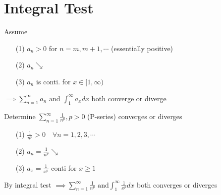 \section{Integral Test}
\begin{defn}
Assume
\begin{itemize}
\item[(1)] \(a_n > 0\) \quad for \(n = m, m + 1, \cdots\) (essentially positive)
\item[(2)] \(a_n \searrow\)
\item[(3)] \(a_n\) is conti. for \(x \in [1, \infty)\)
\end{itemize}
\(\implies \displaystyle \sum^{\infty}_{n = 1} a_n \text{ and } \int^{\infty}_1 a_x dx\) both converge or diverge
\end{defn}
\begin{eg}
Determine \(\displaystyle \sum^{\infty}_{n = 1} \frac{1}{n^p}, p > 0\) (P-series) converges or diverges\\

\soln
\begin{itemize}
\item[(1)] \(\displaystyle \frac{1}{n^p} > 0 \quad \forall n = 1, 2, 3, \cdots\)
\item[(2)] \(\displaystyle a_n = \frac{1}{n^p} \searrow\)
\item[(3)] \(a_x = \frac{1}{x^p}\) conti for \(x \geq 1\)
\end{itemize}
By integral test \(\implies \displaystyle \sum^{\infty}_{n = 1} \frac{1}{n^p} \text{ and} \int^{\infty}_1 \frac{1}{x^p} dx\) both converges or diverges
\end{eg}
